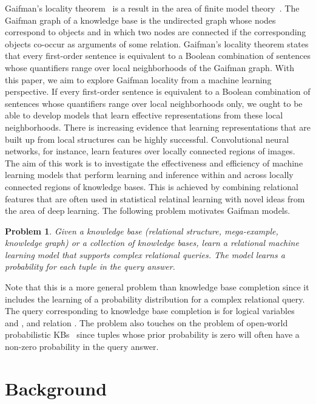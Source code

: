 \documentclass{article}
\newtheorem{problem}{Problem}
\begin{document}
Gaifman's locality theorem~\cite{gaifman:1982} is a result in the area of finite model theory~\cite{Libkin:2004}. The Gaifman graph of a knowledge base is the undirected graph whose nodes correspond to objects and in which two nodes are connected if the corresponding objects co-occur as arguments of some relation. Gaifman's locality theorem states that every first-order sentence is equivalent to a Boolean combination of sentences whose quantifiers range over local  neighborhoods of the Gaifman graph.
With this paper, we aim to explore Gaifman locality from a machine learning perspective. If every first-order sentence is equivalent to a Boolean combination of sentences whose quantifiers range over local neighborhoods only, we ought to be able to develop models that learn effective representations from these local neighborhoods. There is increasing evidence that learning representations that are built up from local structures can be highly successful. Convolutional neural networks, for instance, learn features over locally connected regions of images. The aim of this work is to investigate the effectiveness and efficiency of machine learning models that perform learning and inference within and across locally connected regions of knowledge bases. This is achieved by combining relational features that are often used in statistical relatinal learning with novel ideas from the area of deep learning. The following problem motivates Gaifman models.

\begin{problem} Given a knowledge base (relational structure, mega-example, knowledge graph) or a collection of knowledge bases, learn a relational machine learning model that supports complex relational queries. The model learns a probability for each tuple in the query answer.
\end{problem}

Note that this is a more general problem than knowledge base completion since it includes the learning of a probability distribution for a complex relational query. The query corresponding to knowledge base completion is  for logical variables  and , and relation . The problem also touches on the problem of open-world probabilistic KBs~\cite{CeylanKR16} since tuples whose prior probability is zero will often have a non-zero probability in the query answer.  





\section{Background}
\end{document}
